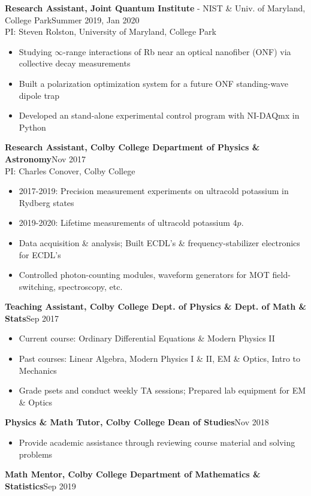 \documentclass[letter, 10pt]{article}
\begin{document}
	\noindent \textbf{Research Assistant, Joint Quantum Institute} - NIST \& Univ. of Maryland, College Park\hfill Summer 2019, Jan 2020 \\ 
	\noindent PI: {Steven Rolston}, University of Maryland, College Park
	\begin{itemize}[noitemsep, nolistsep]
		\item Studying $\infty$-range interactions of Rb near an optical nanofiber (ONF) via collective decay measurements
		\item Built a polarization optimization system for a future ONF standing-wave dipole trap 
		\item Developed an stand-alone experimental control program with NI-DAQmx in Python
	\end{itemize}
	\textbf{Research Assistant, Colby College Department of Physics \& Astronomy}\hfill Nov 2017\textemdash\\
	PI: {Charles Conover}, Colby College
	\begin{itemize}[noitemsep, nolistsep]
		\item 2017-2019: Precision measurement experiments on ultracold potassium in Rydberg states
		\item 2019-2020: Lifetime measurements of ultracold potassium $4p$. 
		\item Data acquisition \& analysis; Built ECDL's \& frequency-stabilizer electronics for ECDL's
		\item Controlled photon-counting modules, waveform generators for MOT field-switching, spectroscopy, etc.

	\end{itemize}	
 	\textbf{Teaching Assistant, Colby College Dept. of Physics \& Dept. of Math \& Stats}\hfill Sep  2017\textemdash  
	\begin{itemize}[noitemsep, nolistsep]
		\item Current course: Ordinary Differential Equations \& Modern Physics II
		\item Past courses: Linear Algebra, Modern Physics I \& II, EM \& Optics, Intro to Mechanics
		\item Grade psets and conduct weekly TA sessions; Prepared lab equipment for EM \& Optics
	\end{itemize}
	\textbf{Physics \& Math Tutor, Colby College Dean of Studies}\hfill Nov 2018\textemdash 
	\begin{itemize}[noitemsep, nolistsep]
		\item Provide academic assistance through reviewing course material and solving problems
	\end{itemize}
	\textbf{Math Mentor, Colby College Department of Mathematics \& Statistics}\hfill Sep 2019\textemdash \\	 
	
\end{document}
